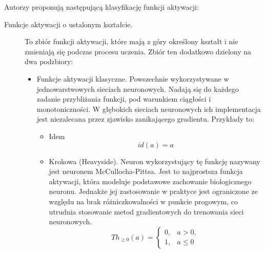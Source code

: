 Autorzy \cite{fa_survey} 
proponują następującą klasyfikację funkcji aktywacji:
\begin{description}
    \item [Funkcje aktywacji o ustalonym kształcie.] To zbiór funkcji aktywacji, które mają z góry określony kształt i nie zmieniają się podczas procesu uczenia. Zbiór ten dodatkowo dzielony na dwa podzbiory:
        \begin{itemize}
            \item Funkcje aktywacji klasyczne. Powszechnie wykorzystywane w jednowarstwowych sieciach neuronowych. Nadają się do każdego zadanie przybliżania funkcji, pod warunkiem ciągłości i monotoniczności. W głębokich sieciach neuronowych ich implementacja jest niezalecana przez zjawisko zanikającego gradientu. Przykłady to:
                \begin{itemize}
                    \item Idem \[id(a) = a\]
                    \item Krokowa (Heavyside). Neuron wykorzystujący tę funkcję nazywany jest neuronem McCullocha-Pittsa. Jest to najprostsza funkcja aktywacji, która modeluje podstawowe zachowanie biologicznego neuronu. Jednakże jej zastosowanie w praktyce jest ograniczone ze względu na brak różniczkowalności w punkcie progowym, co utrudnia stosowanie metod gradientowych do trenowania sieci neuronowych. \cite{haykin2009neural}
                     \[Th_{\geq 0}(a) = \begin{cases}
                                                                0, & a>0, \\
                                                                1, & a \leq 0
                                                            \end{cases}
                                                            \]


\end{itemize}
\end{itemize}
\end{description}
